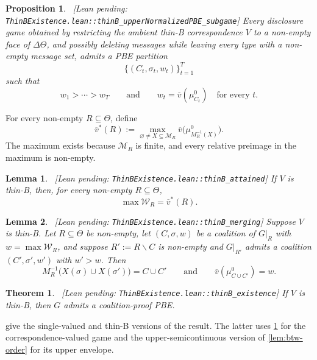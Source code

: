 \documentclass[11pt]{article}
\newtheorem{theorem}{Theorem}
\newtheorem{proposition}{Proposition}
\newtheorem{lemma}{Lemma}
\newcommand{\Msg}{\mathcal{M}}
\newcommand{\W}{\mathcal{W}}
\newcommand{\leanpending}[1]{{\footnotesize\textsf{\textcolor{orange!80!black}{[Lean pending: \texttt{#1}]}}}}
\begin{document}
\begin{proposition}\label{prop:thinB-upper-pbe}\ \leanpending{ThinBExistence.lean::thinB\_upperNormalizedPBE\_subgame}
    Every disclosure game obtained by restricting the ambient thin-B correspondence $V$ to a non-empty face of $\Delta\Theta$, and possibly deleting messages while leaving every type with a non-empty message set, admits a PBE partition
    \[
        \{(C_t,\sigma_t,w_t)\}_{t=1}^T
    \]
    such that
    \[
        w_1>\cdots>w_T
        \qquad\text{and}\qquad
        w_t=\overline v(\mu^0_{C_t})
        \quad\text{for every }t.
    \]
\end{proposition}

For every non-empty $R\subseteq\Theta$, define
\begin{equation}\label{eq:thinB-vstar}
    \overline v^*(R)
    :=
    \max_{\varnothing\ne X\subseteq\Msg_R}
    \overline v\bigl(\mu^0_{M^{-1}_R(X)}\bigr).
\end{equation}
The maximum exists because $\Msg_R$ is finite, and every relative preimage in the maximum is non-empty.

\begin{lemma}\label{lem:thinB-attained}\ \leanpending{ThinBExistence.lean::thinB\_attained}
    If $V$ is thin-B, then, for every non-empty $R\subseteq\Theta$,
    \[
        \max\W_R=\overline v^*(R).
    \]
\end{lemma}

\begin{lemma}\label{lem:thinB-merging}\ \leanpending{ThinBExistence.lean::thinB\_merging}
    Suppose $V$ is thin-B. Let $R\subseteq\Theta$ be non-empty, let $(C,\sigma,w)$ be a coalition of $G\vert_R$ with $w=\max\W_R$, and suppose $R':=R\smallsetminus C$ is non-empty and $G\vert_{R'}$ admits a coalition $(C',\sigma',w')$ with $w'>w$. Then
    \[
        M^{-1}_R\bigl(X(\sigma)\cup X(\sigma')\bigr)
        =
        C\cup C'
        \qquad\text{and}\qquad
        \overline v(\mu^0_{C\cup C'})=w.
    \]
\end{lemma}

\begin{theorem}\label{thm:thinB-cppbe}\ \leanpending{ThinBExistence.lean::thinB\_existence}
    If $V$ is thin-B, then $G$ admits a coalition-proof PBE.
\end{theorem}

 give the single-valued and thin-B versions of the result. The latter uses \cref{prop:thinB-upper-pbe} for the correspondence-valued game and the upper-semicontinuous version of \cref{lem:btw-order} for its upper envelope.
\end{document}
